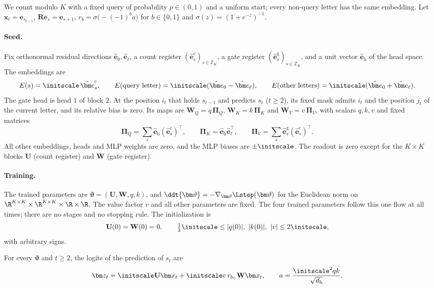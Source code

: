 We count modulo $K$ with a fixed query of probability $p\in(0,1)$ and a uniform start; every non-query letter has the same embedding. Let $\bm x_t=\bm e_{s_{t-1}}$, $\mathbf R\bm e_s=\bm e_{s+1}$, $r_b=\sigma\bigl(-(-1)^ba\bigr)$ for $b\in\{0,1\}$ and $\sigma(z)=(1+e^{-z})^{-1}$.

\paragraph{Seed.} Fix orthonormal residual directions $\hat{\bm e}_0,\hat{\bm e}_\ell$, a count register $(\hat{\bm e}^{\mathrm c}_s)_{s\in\mathbb Z_K}$, a gate register
$(\hat{\bm e}^{\mathrm g}_s)_{s\in\mathbb Z_K}$, and a unit vector $\hat{\bm e}_{\mathrm h}$ of the head space. The embeddings are
\[
 E(s)=\initscale\,\hat{\bm e}^{\mathrm c}_s,\qquad E(\text{query letter})=\initscale(\hat{\bm e}_0-\hat{\bm e}_\ell),\qquad E(\text{other letters})=\initscale(\hat{\bm e}_0+\hat{\bm e}_\ell).
\]
The gate head is head $1$ of block $2$. At the position $i_t$ that holds $s_{t-1}$ and predicts $s_t$ ($t\ge2$), its fixed mask admits
$i_t$ and the position $j_t$ of the current letter, and its relative bias is zero. Its maps are $\mathbf W_Q=q\,\bm\Pi_Q$, $\mathbf W_K=k\,\bm\Pi_K$ and
$\mathbf W_V=v\,\bm\Pi_V$, with scalars $q,k,v$ and fixed matrices
\[
 \bm\Pi_Q=\textstyle\sum_s\hat{\bm e}_{\mathrm h}(\hat{\bm e}^{\mathrm c}_s)^{\!\top},\qquad \bm\Pi_K=\hat{\bm e}_{\mathrm h}\hat{\bm e}_\ell^{\top},\qquad \bm\Pi_V=\sum_s\hat{\bm e}^{\mathrm g}_s(\hat{\bm e}^{\mathrm c}_s)^{\!\top}.
\]
All other embeddings, heads and MLP weights are zero, and the MLP biases are $\pm\initscale$. The readout is zero except for the
$K\times K$ blocks $\mathbf U$ (count register) and $\mathbf W$ (gate register).

\paragraph{Training.} The trained parameters are $\bm\vartheta=(\mathbf U,\mathbf W,q,k)$, and $\ddt{\bm\vartheta}=-\nabla_{\bm\vartheta}\Lstep(\bm\vartheta)$ for the Euclidean norm on
$\R^{K\times K}\times\R^{K\times K}\times\R\times\R$. The value factor $v$ and all other parameters are fixed. The four trained parameters follow
this one flow at all times; there are no stages and no stopping rule. The initialization is
\[
 \mathbf U(0)=\mathbf W(0)=0,\qquad \tfrac{1}{2}\initscale\le|q(0)|,\ |k(0)|,\ |v|\le2\initscale,
\]
with arbitrary signs.

\begin{lemma}
\label{lem:J-features}
For every $\bm\vartheta$ and $t\ge2$, the logits of the prediction of $s_t$ are
\[
 \bm z_t=\initscale \mathbf U\bm x_t+\initscale v\,r_{b_t}\,\mathbf W\bm x_t,\qquad a=\frac{\initscale^2qk}{\sqrt{d_{\mathrm h}}}.
\]
\end{lemma}

